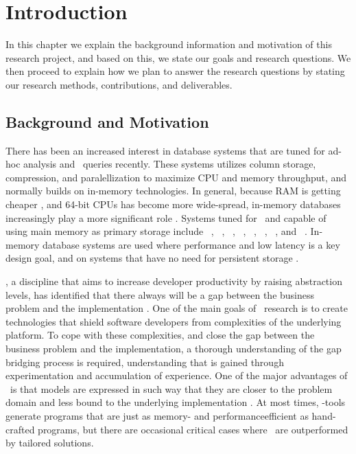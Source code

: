 \chapter{Introduction}
\label{chap:introduction}
In this chapter we explain the background information and motivation of this research project, and based on this, we state our goals and research questions. We then proceed to explain how we plan to answer the research questions by stating our research methods, contributions, and deliverables.
\clearpage

\section{Background and Motivation}
\label{sec:Background and Motivation}
There has been an increased interest in database systems that are tuned for ad-hoc analysis and \bi~queries recently. These systems utilizes column storage, compression, and paralellization to maximize CPU and memory throughput, and normally builds on in-memory technologies. In general, because RAM is getting cheaper \cite{Exasol2014-xh}, and 64-bit CPUs has become more wide-spread, in-memory databases increasingly play a more significant role \cite{Delaney2014-ip}. Systems tuned for \bi~and capable of using main memory as primary storage include \oracle~\cite{Lahiri2015-mz}, \saph~\cite{Farber2012-vh}, \gorilla~\cite{Pelkonen2015-ko}, \qlikview~\cite{Qlik2011-ef}, \tableau~\cite{Kamkolkar2015-iq}, \monetdb~\cite{Boncz2002-yj}, \blink~\cite{Barber2012-xt}, and \sapnw~\cite{Lemke2010-is}. In-memory database systems are used where performance and low latency is a key design goal, and on systems that have no need for persistent storage \cite{Zicari2012-is}. 

\mde, a discipline that aims to increase developer productivity by raising abstraction levels, has identified that there always will be a gap between the business problem and the implementation \cite{France2007-ae}. One of the main goals of \mdd~research is to create technologies that shield software developers from complexities of the underlying platform. To cope with these complexities, and close the gap between the business problem and the implementation, a thorough understanding of the gap bridging process is required, understanding that is gained through experimentation and accumulation of experience. One of the major advantages of \mde~is that models are expressed in such way that they are closer to the problem domain and less bound to the underlying implementation \cite{Selic2003-qa}. At most times, \mdd-tools generate programs that are just as memory- and performanceefficient as hand-crafted programs, but there are occasional critical cases where \mde~are outperformed by tailored solutions.

